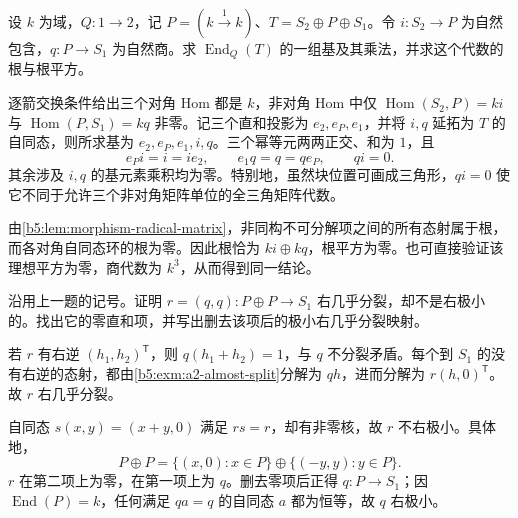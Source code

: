 \begin{optionalexercise}\label{b5:ex:10-endomorphism-radical}
	设 \(k\) 为域，\(Q:1\to2\)，记 \(P=(k\xrightarrow{1}k)\)、\(T=S_2\oplus P\oplus S_1\)。令 \(i:S_2\to P\) 为自然包含，\(q:P\to S_1\) 为自然商。求 \(\operatorname{End}_Q(T)\) 的一组基及其乘法，并求这个代数的根与根平方。
\end{optionalexercise}
\begin{solution}
	逐箭交换条件给出三个对角 Hom 都是 \(k\)，非对角 Hom 中仅 \(\operatorname{Hom}(S_2,P)=ki\) 与 \(\operatorname{Hom}(P,S_1)=kq\) 非零。记三个直和投影为 \(e_2,e_P,e_1\)，并将 \(i,q\) 延拓为 \(T\) 的自同态，则所求基为 \(e_2,e_P,e_1,i,q\)。三个幂等元两两正交、和为 \(1\)，且
	\[
		e_Pi=i=ie_2,\qquad e_1q=q=qe_P,\qquad qi=0.
	\]
	其余涉及 \(i,q\) 的基元素乘积均为零。特别地，虽然块位置可画成三角形，\(qi=0\) 使它不同于允许三个非对角矩阵单位的全三角矩阵代数。

	由\cref{b5:lem:morphism-radical-matrix}，非同构不可分解项之间的所有态射属于根，而各对角自同态环的根为零。因此根恰为 \(ki\oplus kq\)，根平方为零。也可直接验证该理想平方为零，商代数为 \(k^3\)，从而得到同一结论。
\end{solution}

\begin{optionalexercise}\label{b5:ex:10-right-almost-split-minimality}
	沿用上一题的记号。证明 \(r=(q,q):P\oplus P\to S_1\) 右几乎分裂，却不是右极小的。找出它的零直和项，并写出删去该项后的极小右几乎分裂映射。
\end{optionalexercise}
\begin{solution}
	若 \(r\) 有右逆 \((h_1,h_2)^{\mathsf T}\)，则 \(q(h_1+h_2)=1\)，与 \(q\) 不分裂矛盾。每个到 \(S_1\) 的没有右逆的态射，都由\cref{b5:exm:a2-almost-split}分解为 \(qh\)，进而分解为 \(r(h,0)^{\mathsf T}\)。故 \(r\) 右几乎分裂。

	自同态 \(s(x,y)=(x+y,0)\) 满足 \(rs=r\)，却有非零核，故 \(r\) 不右极小。具体地，
	\[
		P\oplus P=\{(x,0):x\in P\}\oplus\{(-y,y):y\in P\}.
	\]
	\(r\) 在第二项上为零，在第一项上为 \(q\)。删去零项后正得 \(q:P\to S_1\)；因 \(\operatorname{End}(P)=k\)，任何满足 \(qa=q\) 的自同态 \(a\) 都为恒等，故 \(q\) 右极小。
\end{solution}

